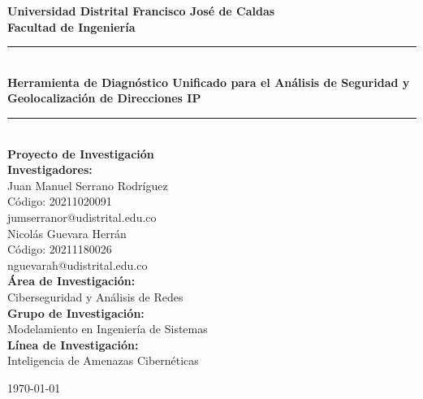\begin{titlepage}
\centering
\vspace*{1cm}

\textbf{\Large Universidad Distrital Francisco José de Caldas}\\
\textbf{\large Facultad de Ingeniería}\\
\vspace{1cm}

\rule{\linewidth}{0.2mm} \\[0.4cm]
{\huge \bfseries Herramienta de Diagnóstico Unificado para el Análisis de Seguridad y Geolocalización de Direcciones IP}\\
\rule{\linewidth}{0.2mm} \\[1.5cm]

{\large \textbf{Proyecto de Investigación}}\\[1cm]

{\large \textbf{Investigadores:}}\\
Juan Manuel Serrano Rodríguez\\
Código: 20211020091\\
jumserranor@udistrital.edu.co\\[2cm]
Nicolás Guevara Herrán\\
Código: 20211180026\\
nguevarah@udistrital.edu.co\\[2cm]

{\large \textbf{Área de Investigación:}}\\
Ciberseguridad y Análisis de Redes\\[1cm]

{\large \textbf{Grupo de Investigación:}}\\
Modelamiento en Ingeniería de Sistemas\\[1cm]

{\large \textbf{Línea de Investigación:}}\\
Inteligencia de Amenazas Cibernéticas\\[2cm]

\vfill

{\large \today}

\end{titlepage}
